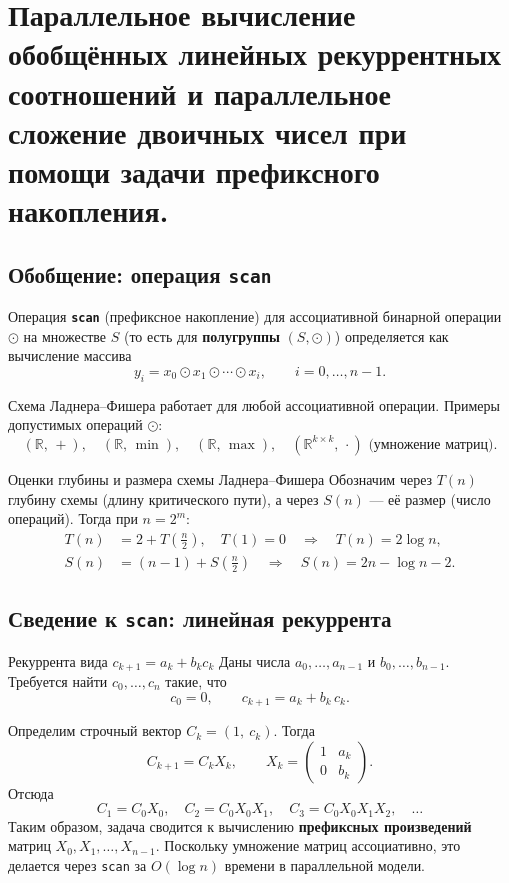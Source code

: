 
\section{Параллельное вычисление обобщённых линейных рекуррентных соотношений и параллельное сложение двоичных чисел при помощи задачи префиксного накопления.}

\subsection{Обобщение: операция \texttt{scan}}

\begin{Definition}{}{}
	Операция \textbf{\texttt{scan}} (префиксное накопление) для ассоциативной бинарной операции $\odot$ на множестве $S$ (то есть для \textbf{полугруппы} $(S, \odot)$) определяется как вычисление массива
	\[
	y_i = x_0 \odot x_1 \odot \cdots \odot x_i, \qquad i = 0, \dots, n-1.
	\]
\end{Definition}

Схема Ладнера–Фишера работает для любой ассоциативной операции. Примеры допустимых операций $\odot$:
\[
(\mathbb{R},\, +), \quad
(\mathbb{R},\, \min), \quad
(\mathbb{R},\, \max), \quad
(\mathbb{R}^{k \times k},\, \cdot) \text{ (умножение матриц)}.
\]

\begin{Statement}{Оценки глубины и размера схемы Ладнера–Фишера}{}
	Обозначим через $T(n)$ глубину схемы (длину критического пути), а через $S(n)$ — её размер (число операций). Тогда при $n = 2^m$:
	\begin{align*}
		T(n) &= 2 + T\!\left(\tfrac{n}{2}\right), \quad T(1) = 0
		\quad \Longrightarrow \quad T(n) = 2\log n, \\
		S(n) &= (n-1) + S\!\left(\tfrac{n}{2}\right)
		\quad \Longrightarrow \quad S(n) = 2n - \log n - 2.
	\end{align*}
\end{Statement}

\subsection{Сведение к \texttt{scan}: линейная рекуррента}

\begin{Example}{Рекуррента вида $c_{k+1} = a_k + b_k c_k$}{}
	Даны числа $a_0, \dots, a_{n-1}$ и $b_0, \dots, b_{n-1}$. Требуется найти $c_0, \dots, c_n$ такие, что
	\[
	c_0 = 0, \qquad c_{k+1} = a_k + b_k\, c_k.
	\]
	
	Определим строчный вектор $C_k = (1,\ c_k)$. Тогда
	\[
	C_{k+1} = C_k X_k, \qquad
	X_k = \begin{pmatrix} 1 & a_k \\ 0 & b_k \end{pmatrix}.
	\]
	Отсюда
	\[
	C_1 = C_0 X_0, \quad
	C_2 = C_0 X_0 X_1, \quad
	C_3 = C_0 X_0 X_1 X_2, \quad \dots
	\]
	Таким образом, задача сводится к вычислению \textbf{префиксных произведений} матриц $X_0, X_1, \dots, X_{n-1}$. Поскольку умножение матриц ассоциативно, это делается через \texttt{scan} за $O(\log n)$ времени в параллельной модели.
\end{Example}

